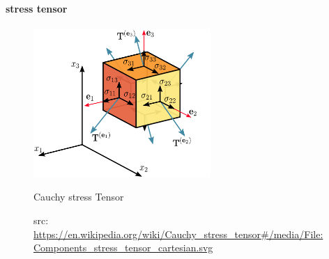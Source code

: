 \documentclass{scrartcl}
\begin{document}
\paragraph{stress tensor}
\begin{figure}[!t]
  \centering
 {
    \includegraphics[width=0.6\textwidth]
    {img/stress_tensor.png}
  }
  \caption{Cauchy stress Tensor}
  \caption*{src: \url{https://en.wikipedia.org/wiki/Cauchy_stress_tensor\#/media/File:Components_stress_tensor_cartesian.svg}}
  \label{cauchy}
\end{figure}
\end{document}
